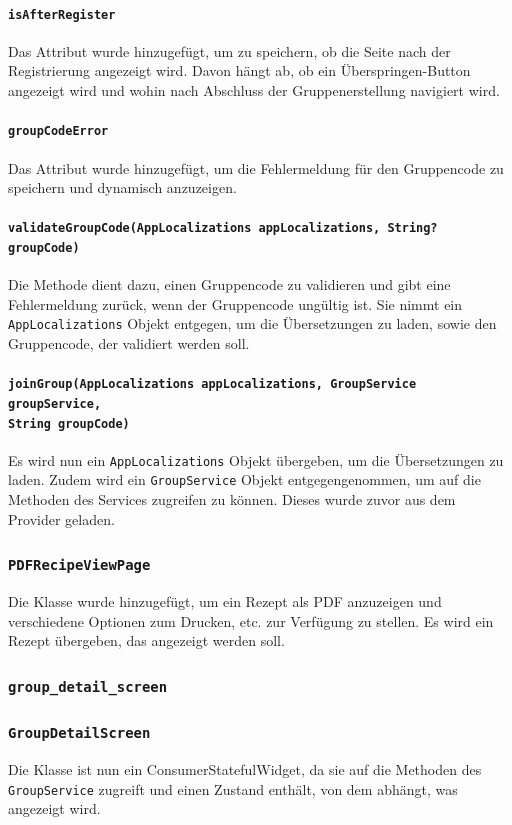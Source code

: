 \documentclass{implementierungsheft}
\begin{document}
\paragraph{\texttt{isAfterRegister}}
Das Attribut wurde hinzugefügt, um zu speichern, ob die Seite nach der Registrierung angezeigt wird. Davon hängt ab, ob ein Überspringen-Button angezeigt wird und wohin nach Abschluss der Gruppenerstellung navigiert wird.
\paragraph{\texttt{groupCodeError}}
Das Attribut wurde hinzugefügt, um die Fehlermeldung für den Gruppencode zu speichern und dynamisch anzuzeigen.
\paragraph*{\texttt{validateGroupCode(AppLocalizations appLocalizations, String? groupCode)}}
Die Methode dient dazu, einen Gruppencode zu validieren und gibt eine Fehlermeldung zurück, wenn der Gruppencode ungültig ist. Sie nimmt ein \texttt{AppLocalizations} Objekt entgegen, um die Übersetzungen zu laden, sowie den Gruppencode, der validiert werden soll.
\paragraph{\texttt{joinGroup(AppLocalizations appLocalizations, GroupService groupService,\\ String      groupCode)}}
Es wird nun ein \texttt{AppLocalizations} Objekt übergeben, um die Übersetzungen zu laden. Zudem wird ein \texttt{GroupService} Objekt entgegengenommen, um auf die Methoden des Services zugreifen zu können. Dieses wurde zuvor aus dem Provider geladen.
\subsubsection{\texttt{PDFRecipeViewPage}}
Die Klasse wurde hinzugefügt, um ein Rezept als PDF anzuzeigen und verschiedene Optionen zum Drucken, etc. zur Verfügung zu stellen. Es wird ein Rezept übergeben, das angezeigt werden soll.
\subsubsection{\texttt{group\_detail\_screen}}
\subsubsection*{\texttt{GroupDetailScreen}}
Die Klasse ist nun ein ConsumerStatefulWidget, da sie auf die Methoden des \texttt{GroupService} zugreift und einen Zustand enthält, von dem abhängt, was angezeigt wird.
\end{document}
